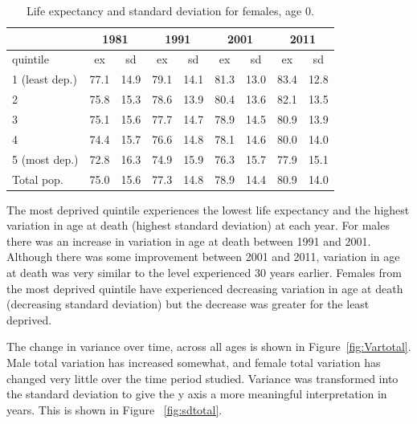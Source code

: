 \documentclass[12pt,oneside,a4paper]{article} %
\theoremstyle{definition}
\begin{document}
\begin{table}[htbp]
  \centering
  \caption{Life expectancy and standard deviation for females, age 0.}
   \label{tab:LESD0f}
    \begin{tabular}{lrrrrrrrr}
          & \multicolumn{2}{c}{1981} & \multicolumn{2}{c}{1991} & \multicolumn{2}{c}{2001} & \multicolumn{2}{c}{2011} \\
    \midrule
    quintile & \multicolumn{1}{c}{ex} & \multicolumn{1}{c}{sd} & \multicolumn{1}{c}{ex} & \multicolumn{1}{c}{sd} & \multicolumn{1}{c}{ex} & \multicolumn{1}{c}{sd} & \multicolumn{1}{c}{ex} & \multicolumn{1}{c}{sd} \\
    \midrule
    1 (least dep.) & 77.1  & 14.9  & 79.1  & 14.1  & 81.3  & 13.0  & 83.4  & 12.8 \\
    2     & 75.8  & 15.3  & 78.6  & 13.9  & 80.4  & 13.6  & 82.1  & 13.5 \\
    3     & 75.1  & 15.6  & 77.7  & 14.7  & 78.9  & 14.5  & 80.9  & 13.9 \\
    4     & 74.4  & 15.7  & 76.6  & 14.8  & 78.1  & 14.6  & 80.0  & 14.0 \\
    5 (most dep.) & 72.8  & 16.3  & 74.9  & 15.9  & 76.3  & 15.7  & 77.9  & 15.1 \\
    Total pop. & 75.0  & 15.6  & 77.3  & 14.8  & 78.9  & 14.4  & 80.9  & 14.0 \\
    \bottomrule
    \end{tabular}%
  \label{tab:addlabel}%
\end{table}%

The most deprived quintile experiences the lowest life expectancy and
the highest variation in age at death (highest standard deviation) at each year. For males there was an
increase in variation in age at death between 1991 and 2001. Although there was
some improvement between 2001 and 2011, variation in age at death was very
similar to the level experienced 30 years earlier. Females from the most
deprived quintile have experienced decreasing variation in age at death (decreasing standard deviation) but the
decrease was greater for the least deprived. 

The change in variance over time, across all ages is shown in Figure~\ref{fig:Vartotal}. Male total variation has increased somewhat, and female total variation has changed
very little over the time period studied. Variance was transformed into the standard deviation to give the y axis a more meaningful interpretation in  years. This is shown in Figure ~\ref{fig:sdtotal}. 
\end{document}
